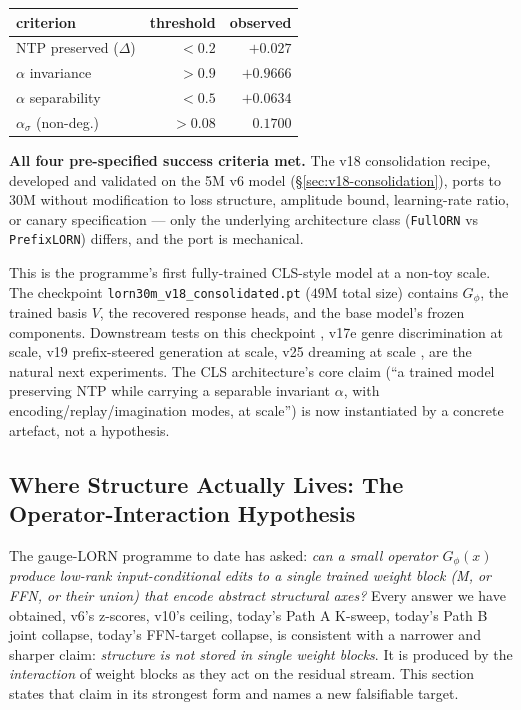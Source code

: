 \documentclass[11pt, a4paper]{article}
\theoremstyle{plain}
\theoremstyle{definition}
\theoremstyle{remark}
\begin{document}
\begin{center}
\small
\begin{tabular}{lrr}
\toprule
criterion & threshold & observed \\
\midrule
NTP preserved ($\Delta$) & $< 0.2$ & $\mathbf{+0.027}$ \\
$\alpha$ invariance      & $> 0.9$ & $\mathbf{+0.9666}$ \\
$\alpha$ separability    & $< 0.5$ & $\mathbf{+0.0634}$ \\
$\alpha_\sigma$ (non-deg.) & $> 0.08$ & $\mathbf{0.1700}$ \\
\bottomrule
\end{tabular}
\end{center}

\textbf{All four pre-specified success criteria met.}
The v18 consolidation recipe, developed and validated on the 5M v6 model (§\ref{sec:v18-consolidation}), ports to 30M without modification to loss structure, amplitude bound, learning-rate ratio, or canary specification — only the underlying architecture class (\texttt{FullORN} vs \texttt{PrefixLORN}) differs, and the port is mechanical.

This is the programme's first fully-trained CLS-style model at a non-toy scale. The checkpoint \texttt{lorn30m\_v18\_consolidated.pt} ($49$M total size) contains $G_\phi$, the trained basis $V$, the recovered response heads, and the base model's frozen components.
Downstream tests on this checkpoint ,  v17e genre discrimination at scale, v19 prefix-steered generation at scale, v25 dreaming at scale ,  are the natural next experiments.
The CLS architecture's core claim (``a trained model preserving NTP while carrying a separable invariant $\alpha$, with encoding/replay/imagination modes, at scale'') is now instantiated by a concrete artefact, not a hypothesis.

\subsection{Where Structure Actually Lives: The Operator-Interaction Hypothesis}
\label{sec:where-structure-lives}

The gauge-LORN programme to date has asked: \emph{can a small operator $G_\phi(x)$ produce low-rank input-conditional edits to a single trained weight block (M, or FFN, or their union) that encode abstract structural axes?}
Every answer we have obtained, v6's z-scores, v10's ceiling, today's Path A K-sweep, today's Path B joint collapse, today's FFN-target collapse, is consistent with a narrower and sharper claim: \emph{structure is not stored in single weight blocks}.
It is produced by the \emph{interaction} of weight blocks as they act on the residual stream.
This section states that claim in its strongest form and names a new falsifiable target.
\end{document}
